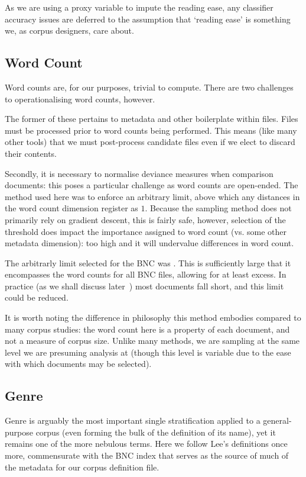 As we are using a proxy variable to impute the reading ease, any classifier accuracy issues are deferred to the assumption that `reading ease' is something we, as corpus designers, care about.






\subsection{Word Count}
Word counts are, for our purposes, trivial to compute.  There are two challenges to operationalising word counts, however.

The former of these pertains to metadata and other boilerplate within files.  Files must be processed prior to word counts being performed.  This means (like many other tools) that we must post-process candidate files even if we elect to discard their contents.

Secondly, it is necessary to normalise deviance measures when comparison documents: this poses a particular challenge as word counts are open-ended.  The method used here was to enforce an arbitrary limit, above which any distances in the word count dimension register as $1$.  Because the sampling method does not primarily rely on gradient descent, this is fairly safe, however, selection of the threshold does impact the importance assigned to word count (vs. some other metadata dimension): too high and it will undervalue differences in word count.

The arbitrarly limit selected for the BNC was .  This is sufficiently large that it encompasses the word counts for all BNC files, allowing for at least  excess.  In practice (as we shall discuss later~) most documents fall short, and this limit could be reduced.

It is worth noting the difference in philosophy this method embodies compared to many corpus studies: the word count here is a property of each document, and not a measure of corpus size.  Unlike many methods, we are sampling at the same level we are presuming analysis at (though this level is variable due to the ease with which documents may be selected).






\subsection{Genre}
Genre is arguably the most important single stratification applied to a general-purpose corpus (even forming the bulk of the definition of its name), yet it remains one of the more nebulous terms.  Here we follow Lee's definitions once more, commensurate with the BNC index that serves as the source of much of the metadata for our corpus definition file.

